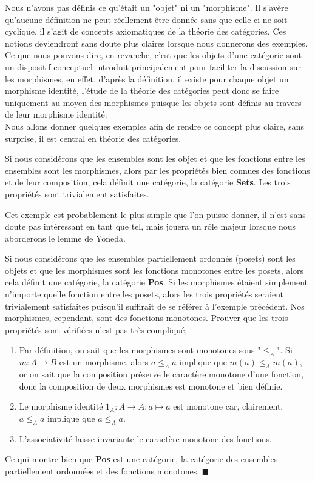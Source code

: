 \documentclass{article}
\begin{document}
Nous n'avons pas définis ce qu'était un "objet" ni un "morphisme". Il s'avère qu'aucune définition ne peut réellement être donnée sans que celle-ci ne soit cyclique, il s'agit de concepts axiomatiques de la théorie des catégories. Ces notions deviendront sans doute plus claires lorsque nous donnerons des exemples. Ce que nous pouvons dire, en revanche, c'est que les objets d'une catégorie sont un dispositif conceptuel introduit principalement pour faciliter la discussion sur les morphismes, en effet, d'après la définition, il existe pour chaque objet un morphisme identité, l'étude de la théorie des catégories peut donc se faire uniquement au moyen des morphismes puisque les objets sont définis au travers de leur morphisme identité.\\

Nous allons donner quelques exemples afin de rendre ce concept plus claire, sans surprise, il est central en théorie des catégories.

\begin{example}[Sets]{}
    Si nous considérons que les ensembles sont les objet et que les fonctions entre les ensembles sont les morphismes, alors par les propriétés bien connues des fonctions et de leur composition, cela définit une catégorie, la catégorie \textbf{Sets}. Les trois propriétés sont trivialement satisfaites.
\end{example}

Cet exemple est probablement le plus simple que l'on puisse donner, il n'est sans doute pas intéressant en tant que tel, mais jouera un rôle majeur lorsque nous aborderons le lemme de Yoneda.\\

\begin{example}[Pos]{}
    Si nous considérons que les ensembles partiellement ordonnés (posets) sont les objets et que les morphismes sont les fonctions monotones entre les posets, alors cela définit une catégorie, la catégorie \textbf{Pos}. Si les morphismes étaient simplement n'importe quelle fonction entre les posets, alors les trois propriétés seraient trivialement satisfaites puisqu'il suffirait de se référer à l'exemple précédent. Nos morphismes, cependant, sont des fonctions monotones. Prouver que les trois propriétés sont vérifiées n'est pas très compliqué,
    \begin{enumerate}
        \item Par définition, on sait que les morphismes sont monotones sous "$\leq_A$". Si $m:A\to B$ est un morphisme, alors $a\leq_Aa$ implique que $m(a)\leq_Am(a)$, or on sait que la composition préserve le caractère monotone d'une fonction, donc la composition de deux morphismes est monotone et bien définie.
        \item Le morphisme identité $1_A:A\to A:a\mapsto a$ est monotone car, clairement, $a\leq_A a$ implique que $a\leq_A a$.
        \item L'associativité laisse invariante le caractère monotone des fonctions.
    \end{enumerate}
    Ce qui montre bien que \textbf{Pos} est une catégorie, la catégorie des ensembles partiellement ordonnées et des fonctions monotones. $\blacksquare$
\end{example}
\end{document}
